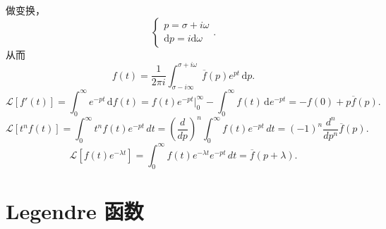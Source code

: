 \documentclass[12pt,a4paper,openany,twoside]{book}
\numberwithin{equation}{section}
\begin{document}
        做变换，
        \begin{equation}
        \begin{cases}
          p = \sigma + i \omega \\
          \mathrm{d}p = i\mathrm{d}\omega
        \end{cases}
        .
        \end{equation}
        从而
        \begin{equation}
          f(t) = \frac{1}{2\pi i} \int ^{\sigma + i \omega} _{\sigma - i \infty} \overline{f}(p) e^{p t} \, \mathrm{d}p 
        .
        \end{equation} 
        \begin{equation}
          \mathcal{L}[f'(t)] = \int ^\infty _0 e^{-pt} \, \mathrm{d}f(t) = f(t)e^{-pt} \bigg|^\infty_0 - \int ^\infty_0 f(t) \, \mathrm{d}e^{-pt} = -f(0) + p \overline{f}(p)   
        .
        \end{equation}
        \begin{equation}
          \mathcal{L}[t^n f(t)] = \int _0^\infty t^n f(t) e^{-pt} \, dt = \left( \frac{d }{d p}  \right) ^n \int_0 ^\infty f(t) e^{-pt} \, dt = (-1)^n \frac{d ^n}{d p^n} \overline{f}(p)  
        .
        \end{equation}
        \begin{equation}
          \mathcal{L}[f(t)e^{-\lambda t}] = \int _0^\infty f(t) e^{-\lambda t}  e^{-pt}\, dt = \overline{f}(p+\lambda) 
        .
        \end{equation} 

      \section{Legendre 函数}
\end{document}
